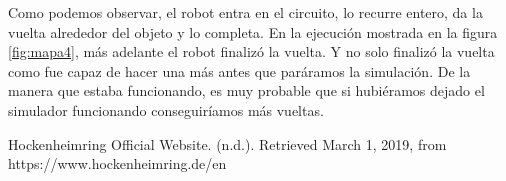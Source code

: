 \documentclass{article}
\begin{document}
Como podemos observar, el robot entra en el circuito, lo recurre entero, da la vuelta alrededor del objeto y lo completa. En la ejecución mostrada en la figura \ref{fig:mapa4}, más adelante el robot finalizó la vuelta. Y no solo finalizó la vuelta como fue capaz de hacer una más antes que paráramos la simulación. De la manera que estaba funcionando, es muy probable que si hubiéramos dejado el simulador funcionando conseguiríamos más vueltas. 


\begin{thebibliography}{1}

     Hockenheimring Official Website. (n.d.). Retrieved March 1, 2019, from https://www.hockenheimring.de/en

\end{thebibliography}














\end{document}

